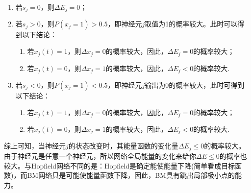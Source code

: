 {            \begin{enumerate}
                \item 若$s_j = 0$，则$\Delta E_j = 0$；
                \item 若$s_j >0$，则$P(x_j=1) > 0.5$，即神经元$j$取值为1的概率较大。此时可以得到以下结论：
                    \begin{enumerate}
                    \item 若$x_j(t)=1$，则$\Delta x_j =0$的概率较大，因此，$\Delta E_j = 0$的概率较大；
                    \item 若$x_j(t)=0$，则$\Delta x_j =1$的概率较大，因此，$\Delta E_j < 0$的概率较大.
                    \end{enumerate}
                \item 若$s_j <0$，则$P(x_j=1)<0.5$，即神经元$j$输出为0的概率较大，此时可得到以下结论：
                    \begin{enumerate}
                    \item 若$x_j(t)=1$，则$\Delta x_j =0$的概率较大，因此，$\Delta E_j = 0$的概率较大；
                    \item 若$x_j(t)=0$，则$\Delta x_j =1$的概率较大，因此，$\Delta E_j < 0$的概率较大.
                    \end{enumerate}
            \end{enumerate}
            \par
            综上可知，当神经元$j$的状态改变时，其能量函数的变化量$\Delta E_j \leqslant 0$的概率较大。由于神经元是任意一个神经元，所以网络全局能量的变化来给你$\Delta E \leqslant 0$的概率也较大。与Hopfield网络不同的是：Hopfield是确定能使能量下降(简单看成目标函数)，而BM网络只是可能使能量函数下降，因此，BM具有跳出局部极小点的能力。
}
